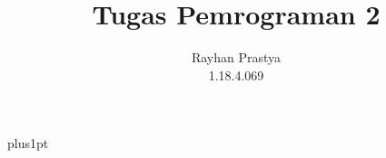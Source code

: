\documentclass[12pt]{ociamthesis}  %
\title{ Tugas Pemrograman 2\\
}   %
\author{Rayhan Prastya \\
1.18.4.069}             %
\begin{document}
\baselineskip=18pt plus1pt

\setcounter{secnumdepth}{3}
\setcounter{tocdepth}{3}


\maketitle                  %

\begin{romanpages}          %
\tableofcontents            %
\end{romanpages}            %



\end{document}
